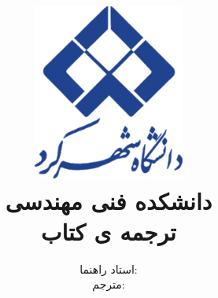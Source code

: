 \title{
    \center
    \includegraphics[width=5cm, height=5.8cm]{images/SKU_logo_color.jpg} \\
    دانشکده فنی مهندسی \\[25pt]     
ترجمه ی کتاب \\
\textbf{\huge \CourseName}
}

\author{
    استاد راهنما:
    \Instructor \\[10pt]
    مترجم:
    \Translator \\[25pt]
}
\date{\Semester}